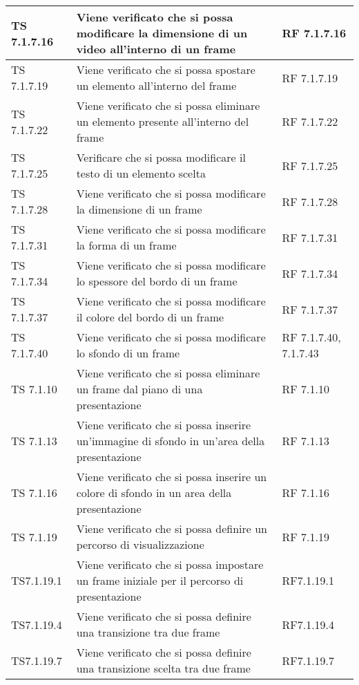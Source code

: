 {{\begin{longtable} [c]{| p{3cm} | p{6cm} |p{3cm}|}
			\hline
			TS 7.1.7.16 & Viene verificato che si possa modificare la dimensione di un video all'interno di un frame\ped{g} & RF 7.1.7.16\\
			\hline
			TS 7.1.7.19 & Viene verificato che si possa spostare un elemento all'interno del frame\ped{g} & RF 7.1.7.19\\
			\hline
			TS 7.1.7.22 & Viene verificato che si possa eliminare un elemento presente all'interno del frame\ped{g} & RF 7.1.7.22 \\
			\hline
			TS 7.1.7.25 & Verificare che si possa modificare il testo di un elemento scelta\ped{g} & RF 7.1.7.25\\
			\hline
			TS 7.1.7.28 & Viene verificato che si possa modificare la dimensione di un frame\ped{g} & RF 7.1.7.28\\
			\hline
			TS 7.1.7.31 & Viene verificato che si possa modificare la forma di un frame\ped{g} & RF 7.1.7.31\\
			\hline
			TS 7.1.7.34 & Viene verificato che si possa modificare lo spessore del bordo di un frame\ped{g} & RF 7.1.7.34\\
			\hline
			TS 7.1.7.37 & Viene verificato che si possa modificare il colore del bordo di un frame\ped{g} & RF 7.1.7.37\\
			\hline
			TS 7.1.7.40 & Viene verificato che si possa modificare lo sfondo di un frame\ped{g} & RF 7.1.7.40, 7.1.7.43\\
			\hline
			TS 7.1.10 & Viene verificato che si possa eliminare un frame\ped{g} dal piano di una presentazione & RF 7.1.10\\
			\hline
			TS 7.1.13 & Viene verificato che si possa inserire un'immagine di sfondo in un'area della presentazione & RF 7.1.13 \\
			\hline
			TS 7.1.16 & Viene verificato che si possa inserire un colore di sfondo in un area della presentazione & RF 7.1.16\\
			\hline
			TS 7.1.19 & Viene verificato che si possa definire un percorso\ped{g} di visualizzazione & RF 7.1.19\\
			\hline				
			TS7.1.19.1 & Viene verificato che si possa impostare un frame\ped{g} iniziale per il percorso\ped{g} di presentazione & RF7.1.19.1\\
			TS7.1.19.4 & Viene verificato che si possa definire una transizione tra due frame\ped{g} & RF7.1.19.4\\
			\hline
			TS7.1.19.7 & Viene verificato che si possa definire una transizione scelta tra due frame\ped{g} & RF7.1.19.7\\

\end{longtable}}}
